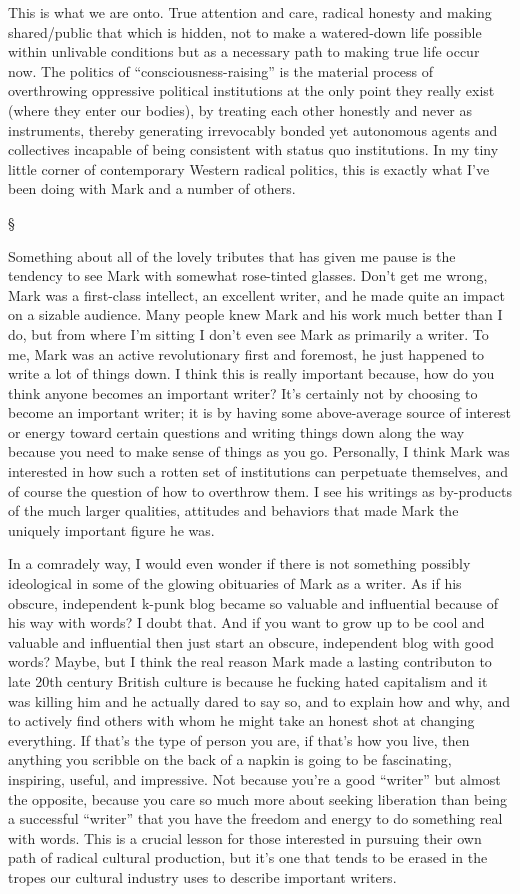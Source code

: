 \documentclass[a4paper,12pt,margin=.5in]{article}
\begin{document}
This is what we are onto. True attention and care, radical honesty and
making shared/public that which is hidden, not to make a watered-down
life possible within unlivable conditions but as a necessary path to
making true life occur now. The politics of ``consciousness-raising'' is
the material process of overthrowing oppressive political institutions
at the only point they really exist (where they enter our bodies), by
treating each other honestly and never as instruments, thereby
generating irrevocably bonded yet autonomous agents and collectives
incapable of being consistent with status quo institutions. In my tiny
little corner of contemporary Western radical politics, this is exactly
what I've been doing with Mark and a number of others.

§

Something about all of the lovely tributes that has given me pause is
the tendency to see Mark with somewhat rose-tinted glasses. Don't get me
wrong, Mark was a first-class intellect, an excellent writer, and he
made quite an impact on a sizable audience. Many people knew Mark and
his work much better than I do, but from where I'm sitting I don't even
see Mark as primarily a writer. To me, Mark was an active revolutionary
first and foremost, he just happened to write a lot of things down. I
think this is really important because, how do you think anyone becomes
an important writer? It's certainly not by choosing to become an
important writer; it is by having some above-average source of interest
or energy toward certain questions and writing things down along the way
because you need to make sense of things as you go. Personally, I think
Mark was interested in how such a rotten set of institutions can
perpetuate themselves, and of course the question of how to overthrow
them. I see his writings as by-products of the much larger qualities,
attitudes and behaviors that made Mark the uniquely important figure he
was.

In a comradely way, I would even wonder if there is not something
possibly ideological in some of the glowing obituaries of Mark as a
writer. As if his obscure, independent k-punk blog became so valuable
and influential because of his way with words? I doubt that. And if you
want to grow up to be cool and valuable and influential then just start
an obscure, independent blog with good words? Maybe, but I think the
real reason Mark made a lasting contributon to late 20th century British
culture is because he fucking hated capitalism and it was killing him
and he actually dared to say so, and to explain how and why, and to
actively find others with whom he might take an honest shot at changing
everything. If that's the type of person you are, if that's how you
live, then anything you scribble on the back of a napkin is going to be
fascinating, inspiring, useful, and impressive. Not because you're a
good ``writer'' but almost the opposite, because you care so much more
about seeking liberation than being a successful ``writer'' that you
have the freedom and energy to do something real with words. This is a
crucial lesson for those interested in pursuing their own path of
radical cultural production, but it's one that tends to be erased in the
tropes our cultural industry uses to describe important writers.
\end{document}
